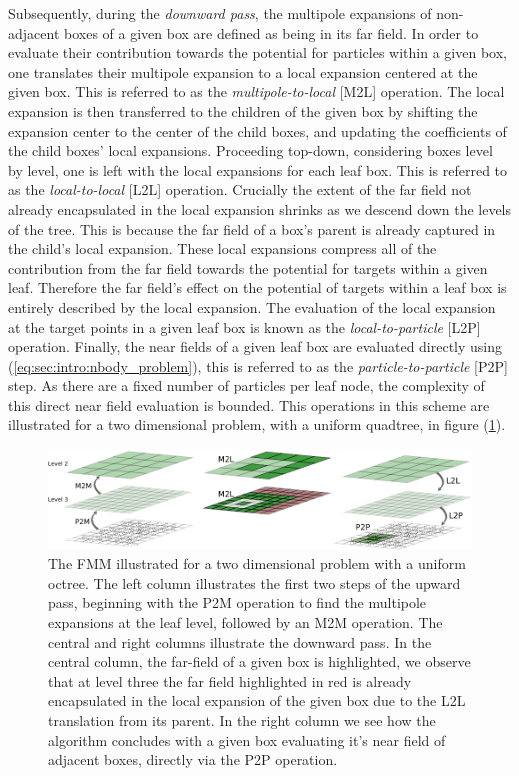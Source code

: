 \documentclass{IEEEcsmag}
\begin{document}
Subsequently, during the \textit{downward pass}, the multipole expansions of non-adjacent boxes of a given box are defined as being in its far field. In order to evaluate their contribution towards the potential for particles within a given box, one translates their multipole expansion to a local expansion centered at the given box. This is referred to as the \textit{multipole-to-local} [M2L] operation. The local expansion is then transferred to the children of the given box by shifting the expansion center to the center of the child boxes, and updating the coefficients of the child boxes' local expansions. Proceeding top-down, considering boxes level by level, one is left with the local expansions for each leaf box. This is referred to as the \textit{local-to-local} [L2L] operation. Crucially the extent of the far field not already encapsulated in the local expansion shrinks as we descend down the levels of the tree. This is because the far field of a box's parent is already captured in the child's local expansion. These local expansions compress all of the contribution from the far field towards the potential for targets within a given leaf. Therefore the far field's effect on the potential of targets within a leaf box is entirely described by the local expansion. The evaluation of the local expansion at the target points in a given leaf box is known as the \textit{local-to-particle} [L2P] operation. Finally, the near fields of a given leaf box are evaluated directly using (\ref{eq:sec:intro:nbody_problem}), this is referred to as the \textit{particle-to-particle} [P2P] step. As there are a fixed number of particles per leaf node, the complexity of this direct near field evaluation is bounded. This operations in this scheme are illustrated for a two dimensional problem, with a uniform quadtree, in figure (\ref{fig:tree_traversal}).

\begin{figure}
\centerline{\includegraphics {figures/algorithm.pdf}}
\caption{The FMM illustrated for a two dimensional problem with a uniform octree. The left column illustrates the first two steps of the upward pass, beginning with the P2M operation to find the multipole expansions at the leaf level, followed by an M2M operation. The central and right columns illustrate the downward pass. In the central column, the far-field of a given box is highlighted, we observe that at level three the far field highlighted in red is already encapsulated in the local expansion of the given box due to the L2L translation from its parent. In the right column we see how the algorithm concludes with a given box evaluating it's near field of adjacent boxes, directly via the P2P operation.}
\label{fig:tree_traversal}
\end{figure}
\end{document}
